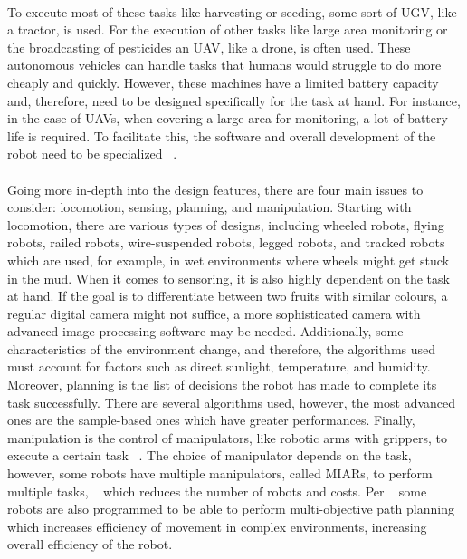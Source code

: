 \paragraph{}To execute most of these tasks like harvesting or seeding, some sort of \gls{UGV}, 
like a tractor, is used. For the execution of other tasks like large area monitoring or the broadcasting 
of pesticides an \gls{UAV}, like a drone, is often used. These autonomous vehicles can handle 
tasks that humans would struggle to do more cheaply and quickly. However, these machines have a limited battery capacity and, 
therefore, need to be designed specifically for the task at hand. For instance, in the case of \gls{UAV}s, 
when covering a large area for monitoring, a lot of battery life is required. To facilitate this, 
the software and overall development of the robot need to be specialized ~\cite{article34, app10103453}.

\paragraph{}Going more in-depth into the design features, there are four main issues to consider: locomotion, sensing, 
planning, and manipulation. Starting with locomotion, there are various types of designs, including wheeled 
robots, flying robots, railed robots, wire-suspended robots, legged robots, and tracked robots which are used, 
for example, in wet environments where wheels might get stuck in the mud. When it comes to sensoring, 
it is also highly dependent on the task at hand. If the goal is to differentiate between two fruits with similar colours, 
a regular digital camera might not suffice, a more sophisticated camera with advanced image processing software may be needed. 
Additionally, some characteristics of the environment change, and therefore, the algorithms used must 
account for factors such as direct sunlight, temperature, and humidity. Moreover, planning is the list of 
decisions the robot has made to complete its task successfully. There are several algorithms used, however, 
the most advanced ones are the sample-based ones which have greater performances. Finally, manipulation is the control of manipulators, 
like robotic arms with grippers, to execute a certain task ~\cite{agriengineering2010010}. The choice of manipulator depends on the task, 
however, some robots have multiple manipulators, called \gls{MIARs}, 
to perform multiple tasks, ~\cite{agriengineering2010010} which reduces the number of robots and costs. Per ~\cite{article34, app10103453} some robots are also programmed 
to be able to perform multi-objective path planning which increases efficiency of movement in complex environments, 
increasing overall efficiency of the robot.

